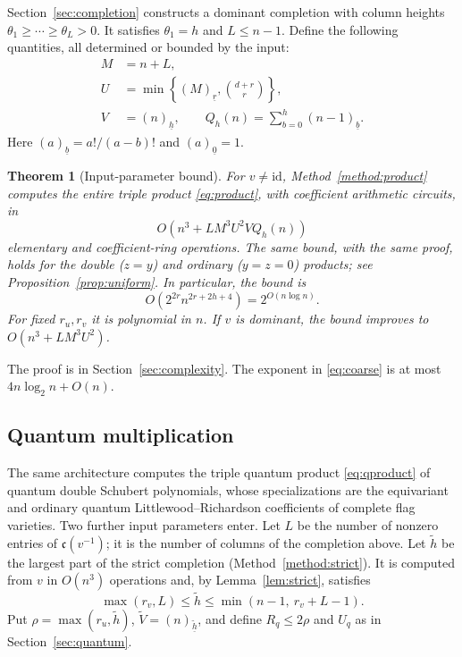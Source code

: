\documentclass{amsart}
\newtheorem{theorem}{Theorem}[section]
\theoremstyle{definition}
\theoremstyle{remark}
\numberwithin{equation}{section}
\newcommand{\code}{\mathfrak c}
\newcommand{\id}{\mathrm{id}}
\newcommand{\fall}[2]{(#1)_{\underline{#2}}}
\begin{document}
Section~\ref{sec:completion} constructs a dominant completion with column
heights $\theta_1\geq\cdots\geq\theta_L>0$.
It satisfies $\theta_1=h$ and $L\leq n-1$.
Define the following quantities, all determined or bounded by the input:
\begin{equation}\label{eq:parameters}
 \begin{split}
 M&=n+L,\\
 U&=\min\left\{\fall{M}{r},\binom{d+r}{r}\right\},\\
 V&=\fall{n}{h},\qquad
 Q_h(n)=\sum_{b=0}^{h}\fall{n-1}{b}.
 \end{split}
\end{equation}
Here $\fall{a}{b}=a!/(a-b)!$ and $\fall{a}{0}=1$.

\begin{theorem}[Input-parameter bound]\label{thm:main}
For $v\ne\id$, Method~\ref{method:product} computes the entire triple
product \eqref{eq:product}, with coefficient arithmetic circuits, in
\begin{equation}\label{eq:main}
 O\left(n^3+L M^3 U^2 V Q_h(n)\right)
\end{equation}
elementary and coefficient-ring operations.
The same bound, with the same proof, holds for the double ($z=y$) and
ordinary ($y=z=0$) products; see Proposition~\ref{prop:uniform}.
In particular, the bound is
\begin{equation}\label{eq:coarse}
 O\left(2^{2r}n^{2r+2h+4}\right)
   =2^{O(n\log n)}.
\end{equation}
For fixed $r_u,r_v$ it is polynomial in $n$.
If $v$ is dominant, the bound improves to
$O(n^3+L M^3 U^2)$.
\end{theorem}

The proof is in Section~\ref{sec:complexity}.
The exponent in \eqref{eq:coarse} is at most $4n\log_2 n+O(n)$.

\subsection{Quantum multiplication}

The same architecture computes the triple quantum product
\eqref{eq:qproduct} of quantum double Schubert polynomials, whose
specializations are the equivariant and ordinary quantum
Littlewood--Richardson coefficients of complete flag varieties.
Two further input parameters enter.
Let $L$ be the number of nonzero entries of $\code(v^{-1})$; it is
the number of columns of the completion above.
Let $\tilde h$ be the largest part of the strict completion
(Method~\ref{method:strict}).
It is computed from $v$ in $O(n^3)$ operations and, by
Lemma~\ref{lem:strict}, satisfies
\[
 \max(r_v,L)\leq\tilde h\leq\min(n-1,\ r_v+L-1).
\]
Put $\rho=\max(r_u,\tilde h)$, $\widetilde V=\fall{n}{\tilde h}$, and
define $R_q\leq2\rho$ and $U_q$ as in Section~\ref{sec:quantum}.
\end{document}
